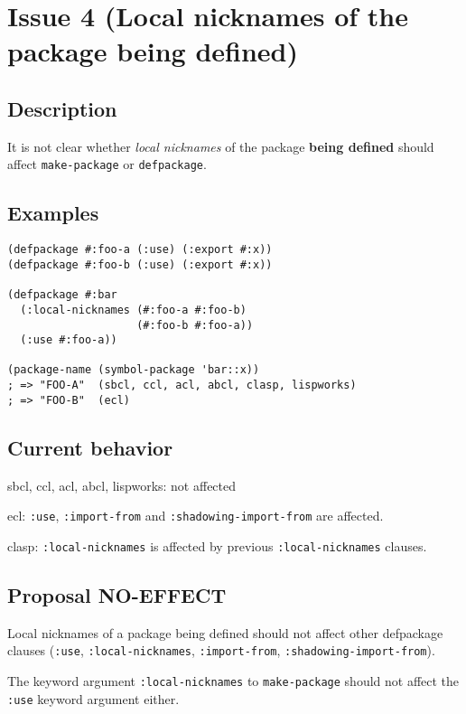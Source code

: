 \documentclass[11pt]{article}
\author{Grolter Bell}
\date{\today}
\title{}
\begin{document}
\section{Issue 4 (Local nicknames of the package being defined)}
\label{sec:orgf1aaf06}
\subsection{Description}
\label{sec:org32a6e7a}
It is not clear whether \emph{local nicknames} of the package \textbf{being defined} should
affect \texttt{make-package} or \texttt{defpackage}.
\subsection{Examples}
\label{sec:orgc9a0512}
\begin{verbatim}
(defpackage #:foo-a (:use) (:export #:x))
(defpackage #:foo-b (:use) (:export #:x))

(defpackage #:bar
  (:local-nicknames (#:foo-a #:foo-b)
                    (#:foo-b #:foo-a))
  (:use #:foo-a))

(package-name (symbol-package 'bar::x))
; => "FOO-A"  (sbcl, ccl, acl, abcl, clasp, lispworks)
; => "FOO-B"  (ecl)
\end{verbatim}
\subsection{Current behavior}
\label{sec:orgf758265}
sbcl, ccl, acl, abcl, lispworks: not affected

ecl: \texttt{:use}, \texttt{:import-from} and \texttt{:shadowing-import-from} are affected.

clasp: \texttt{:local-nicknames} is affected by previous \texttt{:local-nicknames} clauses.
\subsection{Proposal NO-EFFECT}
\label{sec:org548713f}
Local nicknames of a package being defined should not affect other defpackage
clauses (\texttt{:use}, \texttt{:local-nicknames}, \texttt{:import-from}, \texttt{:shadowing-import-from}).

The keyword argument \texttt{:local-nicknames} to \texttt{make-package} should not affect the
\texttt{:use} keyword argument either.
\end{document}
